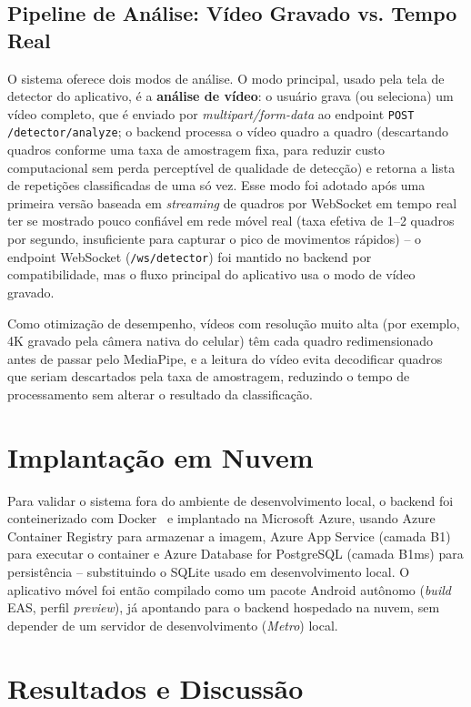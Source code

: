 \documentclass[12pt]{article}
\begin{document}
\subsection{Pipeline de Análise: Vídeo Gravado vs. Tempo Real}

O sistema oferece dois modos de análise. O modo principal, usado pela
tela de detector do aplicativo, é a \textbf{análise de vídeo}: o usuário
grava (ou seleciona) um vídeo completo, que é enviado por
\textit{multipart/form-data} ao endpoint \texttt{POST /detector/analyze};
o backend processa o vídeo quadro a quadro (descartando quadros conforme
uma taxa de amostragem fixa, para reduzir custo computacional sem perda
perceptível de qualidade de detecção) e retorna a lista de repetições
classificadas de uma só vez. Esse modo foi adotado após uma primeira
versão baseada em \textit{streaming} de quadros por WebSocket em tempo
real ter se mostrado pouco confiável em rede móvel real (taxa efetiva de
1--2 quadros por segundo, insuficiente para capturar o pico de movimentos
rápidos) -- o endpoint WebSocket (\texttt{/ws/detector}) foi mantido no
backend por compatibilidade, mas o fluxo principal do aplicativo usa o
modo de vídeo gravado.

Como otimização de desempenho, vídeos com resolução muito alta (por
exemplo, 4K gravado pela câmera nativa do celular) têm cada quadro
redimensionado antes de passar pelo MediaPipe, e a leitura do vídeo evita
decodificar quadros que seriam descartados pela taxa de amostragem,
reduzindo o tempo de processamento sem alterar o resultado da
classificação.

\section{Implantação em Nuvem}

Para validar o sistema fora do ambiente de desenvolvimento local, o
backend foi conteinerizado com Docker~\cite{docker} e implantado na
Microsoft Azure, usando Azure Container Registry para armazenar a imagem,
Azure App Service (camada B1) para executar o container e Azure Database
for PostgreSQL (camada B1ms) para persistência -- substituindo o SQLite
usado em desenvolvimento local. O aplicativo móvel foi então compilado
como um pacote Android autônomo (\textit{build} EAS, perfil
\textit{preview}), já apontando para o backend hospedado na nuvem, sem
depender de um servidor de desenvolvimento (\textit{Metro}) local.

\section{Resultados e Discussão}
\end{document}
